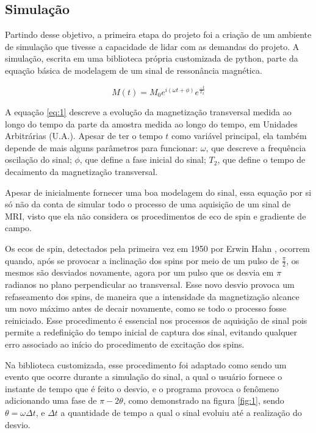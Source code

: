 \documentclass{article}
\begin{document}
\subsection{Simulação}

Partindo desse objetivo, a primeira etapa do projeto foi a criação de um ambiente de simulação
que tivesse a capacidade de lidar com as demandas do projeto. A simulação, escrita em uma biblioteca 
própria customizada de python, parte da equação básica de modelagem de um sinal de ressonância magnética.

\begin{equation} \label{eq:1}
    M(t) = M_0 e^{i(\omega t + \phi)} e^{\frac{-t}{T_2}}
\end{equation}

A equação \ref{eq:1} descreve a evolução da magnetização transversal medida ao longo do tempo da parte da amostra medida ao longo do tempo, em Unidades Arbitrárias (U.A.). 
Apesar de ter o tempo $t$ como variável principal, ela também depende de mais alguns parâmetros para 
funcionar: $\omega$, que descreve a frequência oscilação do sinal; $\phi$, que define a fase inicial do 
sinal; $T_2$, que define o tempo de decaimento da magnetização transversal. 

Apesar de inicialmente fornecer uma boa modelagem do sinal, essa equação por si só não da conta de simular todo o processo de 
uma aquisição de um sinal de MRI, visto que ela não considera os procedimentos de eco de spin e gradiente de campo. 

Os ecos de spin, detectados pela primeira vez em 1950 por Erwin Hahn \cite{PhysRev.80.580}, ocorrem quando, após se provocar a 
inclinação dos spins por meio de um pulso de $\frac{\pi}{2}$, os mesmos são desviados novamente, agora por um pulso que os desvia em 
$\pi$ radianos no plano perpendicular ao transversal. Esse novo desvio provoca um refaseamento dos spins, de maneira que a intensidade
da magnetização alcance um novo máximo antes de decair novamente, como se todo o processo fosse reiniciado. Esse procedimento é 
essencial nos processos de aquisição de sinal pois permite a redefinição do tempo inicial de captura dos sinal, evitando qualquer erro 
associado ao início do procedimento de excitação dos spins.

Na biblioteca customizada, esse procedimento foi adaptado como sendo um evento que ocorre durante a simulação do sinal, a qual o 
usuário fornece o instante de tempo que é feito o desvio, e o programa provoca o fenômeno adicionando uma fase de $\pi - 2\theta$, 
como demonstrado na figura \ref{fig:1}, sendo $\theta = \omega \Delta t$, e $\Delta t$ a quantidade de tempo a qual o sinal evoluiu 
até a realização do desvio.   
\end{document}
